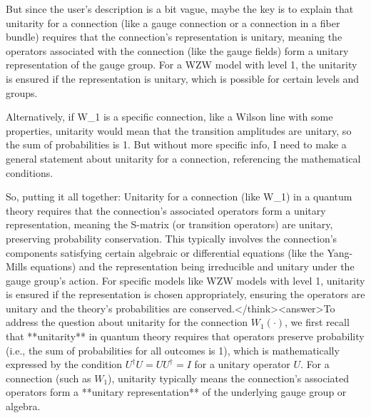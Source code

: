 But since the user's description is a bit vague, maybe the key is to explain that unitarity for a connection (like a gauge connection or a connection in a fiber bundle) requires that the connection's representation is unitary, meaning the operators associated with the connection (like the gauge fields) form a unitary representation of the gauge group. For a WZW model with level 1, the unitarity is ensured if the representation is unitary, which is possible for certain levels and groups.

Alternatively, if W_1 is a specific connection, like a Wilson line with some properties, unitarity would mean that the transition amplitudes are unitary, so the sum of probabilities is 1. But without more specific info, I need to make a general statement about unitarity for a connection, referencing the mathematical conditions.

So, putting it all together: Unitarity for a connection (like W_1) in a quantum theory requires that the connection's associated operators form a unitary representation, meaning the S-matrix (or transition operators) are unitary, preserving probability conservation. This typically involves the connection's components satisfying certain algebraic or differential equations (like the Yang-Mills equations) and the representation being irreducible and unitary under the gauge group's action. For specific models like WZW models with level 1, unitarity is ensured if the representation is chosen appropriately, ensuring the operators are unitary and the theory's probabilities are conserved.</think><answer>To address the question about unitarity for the connection \( W_1(\cdot) \), we first recall that **unitarity** in quantum theory requires that operators preserve probability (i.e., the sum of probabilities for all outcomes is 1), which is mathematically expressed by the condition \( U^\dagger U = UU^\dagger = I \) for a unitary operator \( U \). For a connection (such as \( W_1 \)), unitarity typically means the connection’s associated operators form a **unitary representation** of the underlying gauge group or algebra.  


